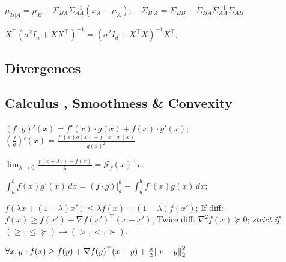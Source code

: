 \begin{definition}[Cond]
    \(\mu_{B|A} = \mu_B + \Sigma_{BA}\Sigma_{AA}^{-1}(x_A - \mu_A), \quad \Sigma_{B|A} = \Sigma_{BB} - \Sigma_{BA}\Sigma_{AA}^{-1}\Sigma_{AB}\)
\end{definition}

\begin{lemma}
    \(X^\top (\sigma^2 I_n + XX^\top)^{-1} = (\sigma^2 I_d + X^\top X)^{-1} X^\top\).
\end{lemma}


\subsection{Divergences}

\subsection{Calculus , Smoothness \& Convexity}

\begin{theorem}
    \((f \cdot g)'(x) = f'(x) \cdot g(x) + f(x) \cdot g'(x)\);
    \(\left(\frac{f}{g}\right)'(x) = \frac{f'(x)g(x) - f(x)g'(x)}{g(x)^2}\)
\end{theorem}

\begin{definition}
    \(\lim_{\lambda \to 0} \frac{f(x + \lambda v) - f(x)}{\lambda} = \mathcal{J}_f(x)^\top v\).
\end{definition}

\begin{theorem}
    \(\int_a^b f(x) g'(x) \, dx = (f \cdot g)\vert_a^b - \int_a^b f'(x) g(x) \, dx\);
\end{theorem}

\begin{definition}[Convex]
    \(f(\lambda x + (1 - \lambda)x') \leq \lambda f(x) + (1 - \lambda)f(x')\);
    If diff: \(f(x) \geq f(x') + \nabla f(x')^\top(x - x')\);
    Twice diff: \(\nabla^2 f(x) \succeq 0\);
    \textit{strict if}: \((\geq, \leq \succeq) \to (>, <, \succ)\).
\end{definition}

\begin{definition}
    \(\forall x, y: f(x) \geq f(y) + \nabla f(y)^\top (x - y) + \frac \mu 2 \norm{x - y}_2^2\)
\end{definition}

